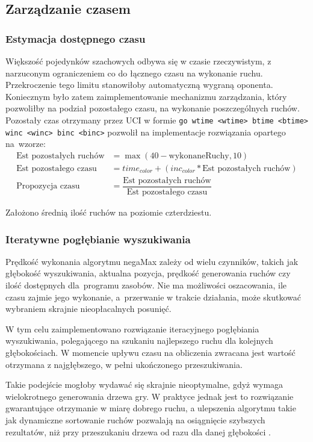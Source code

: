 \subsection{Zarządzanie czasem}
\label{subsec:zarzadzanie-czasem}
\subsubsection{Estymacja dostępnego czasu}
Większość pojedynków szachowych odbywa się w czasie rzeczywistym, z narzuconym ograniczeniem co do łącznego czasu na wykonanie ruchu.
Przekroczenie tego limitu stanowiłoby automatyczną wygraną oponenta.
Koniecznym było zatem zaimplementowanie mechanizmu zarządzania, który pozwoliłby na podział pozostałego czasu, na wykonanie poszczególnych ruchów.
Pozostały czas otrzymany przez UCI w formie \texttt{go wtime <wtime> btime <btime> winc <winc> binc <binc>} pozwolił na implementacje rozwiązania opartego na~wzorze:
\begin{align*}
    \text{Est pozostałych ruchów} &= {\max(40 - \text{wykonaneRuchy}, 10)} \\
    \text{Est pozostałego czasu} &= time_{color} + (inc_{color} * \text{Est pozostałych ruchów}) \\
    \text{Propozycja czasu} &= \dfrac{\text{Est pozostałych ruchów}}{\text{Est pozostałego czasu}}
\end{align*}

Założono średnią ilość ruchów na poziomie czterdziestu.

\subsubsection{Iteratywne pogłębianie wyszukiwania}
Prędkość wykonania algorytmu negaMax zależy od wielu czynników, takich jak głębokość wyszukiwania, aktualna pozycja, prędkość generowania ruchów czy ilość dostępnych dla~programu zasobów.
Nie ma możliwości oszacowania, ile czasu zajmie jego wykonanie, a~przerwanie w trakcie działania, może skutkować wybraniem skrajnie nieopłacalnych posunięć.

W tym celu zaimplementowano rozwiązanie iteracyjnego pogłębiania wyszukiwania, polegającego na szukaniu najlepszego ruchu dla kolejnych głębokościach.
W momencie upływu czasu na obliczenia zwracana jest wartość otrzymana z najgłębszego, w pełni ukończonego przeszukiwania.

Takie podejście mogłoby wydawać się skrajnie nieoptymalne, gdyż wymaga wielokrotnego generowania drzewa gry.
W praktyce jednak jest to rozwiązanie gwarantujące otrzymanie w miarę dobrego ruchu, a ulepszenia algorytmu takie jak dynamiczne sortowanie ruchów pozwalają na osiągnięcie szybszych rezultatów, niż przy przeszukaniu drzewa od razu dla danej głębokości \cite*{wiki-deepening}.
